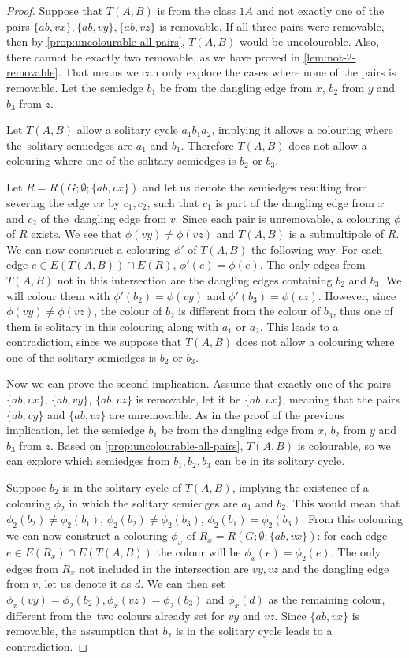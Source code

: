 \begin{proof}
	Suppose that $T(A,B)$ is from the class $1A$ and not exactly one of the pairs $\{ab,vx\}, \{ab,vy\}, \{ab,vz\}$ is removable. If all three pairs were removable, then by \cref{prop:uncolourable-all-pairs}, $T(A,B)$ would be uncolourable. Also, there cannot be exactly two removable, as we have proved in \cref{lem:not-2-removable}. That means we can only explore the cases where none of the pairs is removable. Let the semiedge $b_1$ be from the dangling edge from $x$, $b_2$ from $y$ and $b_3$ from $z$.
	
	Let $T(A,B)$ allow a solitary cycle $a_1b_1a_2$, implying it allows a colouring where the~solitary semiedges are $a_1$ and $b_1$. Therefore $T(A,B)$ does not allow a colouring where one of the solitary semiedges is $b_2$ or $b_3$.
	
	Let $R=R(G;\emptyset;\{ab,vx\})$ and let us denote the semiedges resulting from severing the edge $vx$ by $c_1,c_2$, such that $c_1$ is part of the dangling edge from $x$ and $c_2$ of the~dangling edge from $v$. Since each pair is unremovable, a colouring $\phi$ of $R$ exists. We see that $\phi(vy)\neq \phi(vz)$ and $T(A,B)$ is a submultipole of $R$. We can now construct a colouring $\phi'$ of $T(A,B)$ the following way. For each edge $e\in E(T(A,B))\cap E(R)$, $\phi'(e)=\phi(e)$. The only edges from $T(A,B)$ not in this intersection are the dangling edges containing $b_2$ and $b_3$. We will colour them with $\phi'(b_2)=\phi(vy)$ and $\phi'(b_3)=\phi(vz)$. However, since $\phi(vy)\neq \phi(vz)$, the colour of $b_2$ is different from the colour of $b_3$, thus one of them is solitary in this colouring along with $a_1$ or $a_2$. This leads to a contradiction, since we suppose that $T(A,B)$ does not allow a colouring where one of the solitary semiedges is $b_2$ or $b_3$.
	
	Now we can prove the second implication. Assume that exactly one of the pairs $\{ab,vx\}$, $\{ab,vy\}$, $\{ab,vz\}$ is removable, let it be $\{ab,vx\}$, meaning that the pairs $\{ab,vy\}$ and $\{ab,vz\}$ are unremovable. As in the proof of the previous implication, let the semiedge $b_1$ be from the dangling edge from $x$, $b_2$ from $y$ and $b_3$ from $z$. Based on \cref{prop:uncolourable-all-pairs}, $T(A,B)$ is colourable, so we can explore which semiedges from $b_1,b_2,b_3$ can be in its solitary cycle.
	
	Suppose $b_2$ is in the solitary cycle of $T(A,B)$, implying the existence of a colouring $\phi_2$ in which the solitary semiedges are $a_1$ and $b_2$. This would mean that $\phi_2(b_2)\neq \phi_2(b_1)$, $\phi_2(b_2)\neq \phi_2(b_3)$, $\phi_2(b_1)= \phi_2(b_3)$. From this colouring we can now construct a colouring $\phi_x$ of $R_x=R(G;\emptyset;\{ab,vx\})$: for each edge $e\in E(R_x)\cap E(T(A,B))$ the colour will be $\phi_x(e)=\phi_2(e)$. The only edges from $R_x$ not included in the intersection are $vy, vz$ and the dangling edge from $v$, let us denote it as $d$. We can then set $\phi_x(vy)=\phi_2(b_2), \phi_x(vz)=\phi_2(b_3)$ and $\phi_x(d)$ as the remaining colour, different from the~two colours already set for $vy$ and $vz$. Since $\{ab,vx\}$ is removable, the assumption that $b_2$ is in the solitary cycle leads to a contradiction.
	

\end{proof}
